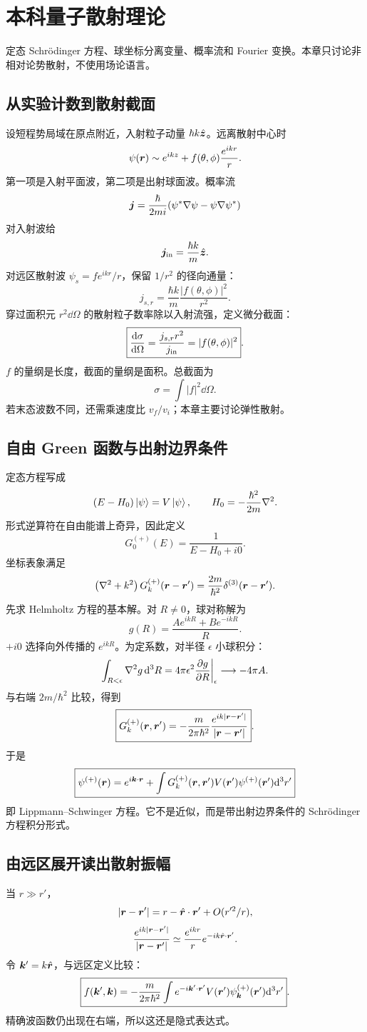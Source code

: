 \chapter{本科量子散射理论}

\begin{prereqbox}
定态 Schrödinger 方程、球坐标分离变量、概率流和 Fourier 变换。本章只讨论非相对论势散射，不使用场论语言。
\end{prereqbox}

\section{从实验计数到散射截面}
设短程势局域在原点附近，入射粒子动量 $\hbar k\hat{\bm{z}}$。远离散射中心时
\[
\psi(\bm{r})\sim e^{ikz}+f(\theta,\phi)\frac{e^{ikr}}r.
\]
第一项是入射平面波，第二项是出射球面波。概率流
\[
\bm{j}=\frac{\hbar}{2mi}(\psi^*\nabla\psi-\psi\nabla\psi^*)
\]
对入射波给
\[
\bm{j}_{\rm in}=\frac{\hbar k}{m}\hat{\bm{z}}.
\]
对远区散射波 $\psi_s=f e^{ikr}/r$，保留 $1/r^2$ 的径向通量：
\[
j_{s,r}=\frac{\hbar k}{m}\frac{|f(\theta,\phi)|^2}{r^2}.
\]
穿过面积元 $r^2\dd\Omega$ 的散射粒子数率除以入射流强，定义微分截面：
\[
\boxed{\frac{\mathrm d \sigma}{\mathrm d \Omega}
=\frac{j_{s,r}r^2}{j_{\rm in}}=|f(\theta,\phi)|^2}.
\]
$f$ 的量纲是长度，截面的量纲是面积。总截面为
\[
\sigma=\int |f|^2\dd\Omega.
\]
若末态波数不同，还需乘速度比 $v_f/v_i$；本章主要讨论弹性散射。

\section{自由 Green 函数与出射边界条件}
定态方程写成
\[
(E-H_0)\left|\psi\right\rangle=V\left|\psi\right\rangle,\qquad
H_0=-\frac{\hbar^2}{2m}\nabla^2.
\]
形式逆算符在自由能谱上奇异，因此定义
\[
G_0^{(+)}(E)=\frac1{E-H_0+i0}.
\]
坐标表象满足
\[
\left(\nabla^2+k^2\right)G_k^{(+)}(\bm{r}-\bm{r}')
=\frac{2m}{\hbar^2}\delta^{(3)}(\bm{r}-\bm{r}').
\]
先求 Helmholtz 方程的基本解。对 $R\ne0$，球对称解为
\[
g(R)=\frac{Ae^{ikR}+Be^{-ikR}}R.
\]
$+i0$ 选择向外传播的 $e^{ikR}$。为定系数，对半径 $\epsilon$ 小球积分：
\[
\int_{R<\epsilon}\nabla^2g\,\mathrm d^3R
=4\pi\epsilon^2\frac{\partial g}{\partial R}\bigg|_\epsilon
\longrightarrow-4\pi A.
\]
与右端 $2m/\hbar^2$ 比较，得到
\[
\boxed{
G_k^{(+)}(\bm{r},\bm{r}')
=-\frac{m}{2\pi\hbar^2}
\frac{e^{ik|\bm{r}-\bm{r}'|}}{|\bm{r}-\bm{r}'|}}.
\]
于是
\[
\boxed{\psi^{(+)}(\bm{r})
=e^{i\bm{k}\cdot\bm{r}}
+\int G_k^{(+)}(\bm{r},\bm{r}')V(\bm{r}')
\psi^{(+)}(\bm{r}')\mathrm d^3r'}
\]
即 Lippmann--Schwinger 方程。它不是近似，而是带出射边界条件的 Schrödinger 方程积分形式。

\section{由远区展开读出散射振幅}
当 $r\gg r'$，
\[
|\bm{r}-\bm{r}'|
=r-\hat{\bm{r}}\cdot\bm{r}'+O(r'^2/r),
\]
\[
\frac{e^{ik|\bm{r}-\bm{r}'|}}{|\bm{r}-\bm{r}'|}
\simeq\frac{e^{ikr}}r e^{-ik\hat{\bm{r}}\cdot\bm{r}'}.
\]
令 $\bm{k}'=k\hat{\bm{r}}$，与远区定义比较：
\[
\boxed{
f(\bm{k}',\bm{k})
=-\frac{m}{2\pi\hbar^2}
\int e^{-i\bm{k}'\cdot\bm{r}'}
V(\bm{r}')\psi^{(+)}_{\bm{k}}(\bm{r}')\mathrm d^3r'}.
\]
精确波函数仍出现在右端，所以这还是隐式表达式。

